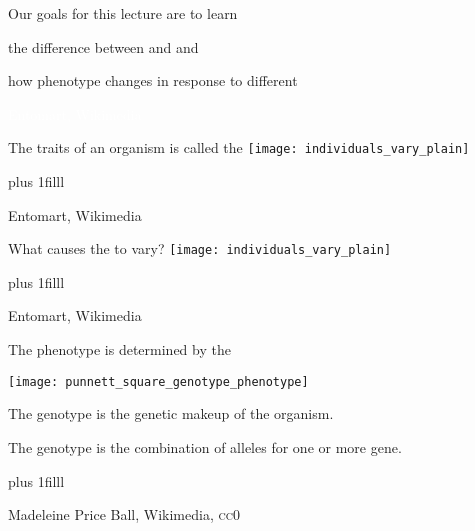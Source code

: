 \documentclass[t,handout]{beamer}  %
\newcommand{\btVFill}{\vskip0pt plus 1filll}
\begin{document}
\begin{frame}[t]{Our goals for this lecture are to learn}

	
	\hangpara	the difference between  and  and

	\hangpara how phenotype changes in response to different 
	
\end{frame}

%
{
\begin{frame}[b]
\hfill\textcolor{white}{\tiny \textcopyright Entomart, Wikimedia}
\end{frame}
}
\begin{frame}[t]{The traits of an organism is called the }
	\centering
	\texttt{[image: individuals\_vary\_plain]}\par
	
	\btVFill
	
	\hfill\tiny \textcopyright Entomart, Wikimedia

\end{frame}
%
\begin{frame}[t]{What causes the  to vary?}
	\centering
	\texttt{[image: individuals\_vary\_plain]}
	
		\btVFill
	
	\hfill\tiny \textcopyright Entomart, Wikimedia

\end{frame}
%
\begin{frame}[t]{The phenotype is determined by the }

	\begin{multicols}{2}
	
		\texttt{[image: punnett\_square\_genotype\_phenotype]}
	
	\columnbreak

	The genotype is the genetic makeup of the organism.\vspace*{2\baselineskip}
	
	The genotype is the combination of alleles for one or more gene.
	
	\end{multicols}
	
	\btVFill
	
	\tiny Madeleine Price Ball, Wikimedia, \textsc{cc0}

\end{frame}
\end{document}
